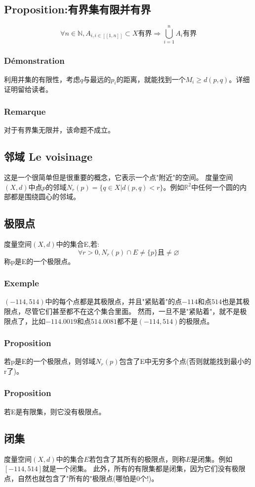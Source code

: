 \documentclass[12pt, a4paper, oneside]{ctexbook}
\begin{document}
  \subsection{Proposition:有界集有限并有界}
  $$
  \forall n\in \mathbb{N},A_{i,i\in [\![1,n]\!]}\subset X\text{有界}\Rightarrow \bigcup_{i=1}^n A_i\text{有界}
  $$
  \subsubsection{Démonstration}
  利用并集的有限性，考虑$q$与最远的$p_i$的距离，就能找到一个$M_i\ge d(p,q)$。详细证明留给读者。
  \subsubsection{Remarque}
  对于有界集无限并，该命题不成立。

  \subsection{邻域 Le voisinage}     \label{myref:邻域}
  这是一个很简单但是很重要的概念，它表示一个点"附近"的空间。
  度量空间$(X,d)$中点$p$的邻域$N_r(p)=\{q\in X | d(p,q)<r\}$。例如$\mathbb{R}^2$中任何一个圆的内部都是围绕圆心的邻域。
  \subsection{极限点}
  度量空间$(X,d)$中的集合E,若:
  $$
  \forall r>0, N_r(p)\cap E\neq\{p\}\mbox{且}\neq\varnothing 
  $$
  称p是E的一个极限点。
  \subsubsection{Exemple}
  $(-114,514)$中的每个点都是其极限点，并且"紧贴着"的点$-114$和点$514$也是其极限点，尽管它们甚至都不在这个集合里面。
  然而，一旦不是"紧贴着"，就不是极限点了，比如$-114.0019$和点$514.0081$都不是$(-114,514)$的极限点。
  \subsubsection{Proposition}
  若p是E的一个极限点，则邻域$N_r(p)$包含了E中无穷多个点(否则就能找到最小的r了)。
  \subsubsection{Proposition}
  若E是有限集，则它没有极限点。
  \subsection{闭集}
  度量空间$(X,d)$中的集合$E$若包含了其所有的极限点，则称$E$是闭集。例如$[-114,514]$就是一个闭集。
  此外，所有的有限集都是闭集，因为它们没有极限点，自然也就包含了"所有的"极限点(哪怕是0个!)。
\end{document}
